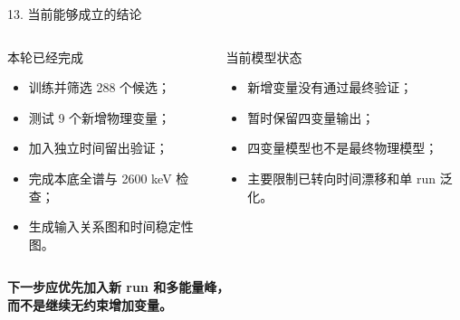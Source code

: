 \documentclass[aspectratio=169,11pt]{beamer}
\begin{document}
\begin{frame}{13. 当前能够成立的结论}
\begin{columns}[T,onlytextwidth]
\begin{block}{本轮已经完成}\begin{itemize}\item 训练并筛选 288 个候选；\item 测试 9 个新增物理变量；\item 加入独立时间留出验证；\item 完成本底全谱与 2600 keV 检查；\item 生成输入关系图和时间稳定性图。\end{itemize}\end{block}
\begin{block}{当前模型状态}\begin{itemize}\item 新增变量没有通过最终验证；\item 暂时保留四变量输出；\item 四变量模型也不是最终物理模型；\item 主要限制已转向时间漂移和单 run 泛化。\end{itemize}\end{block}
\end{columns}
\vspace{0.3cm}\centering\Large\color{navy}\bfseries 下一步应优先加入新 run 和多能量峰，\\而不是继续无约束增加变量。
\end{frame}
\end{document}
